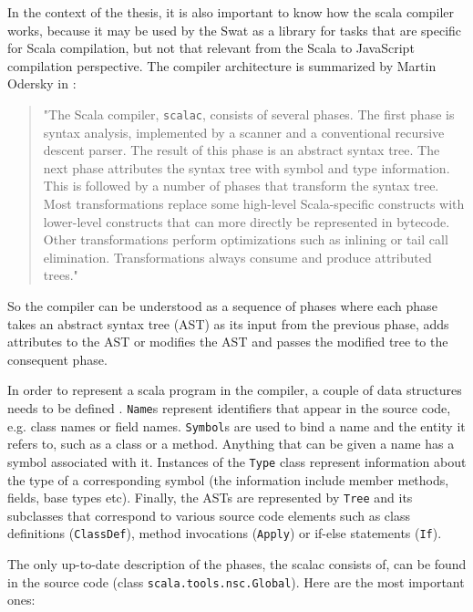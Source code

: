 \documentclass[12pt,a4paper]{report}
\begin{document}
In the context of the thesis, it is also important to know how the scala compiler works, because it may be used by the Swat as a library for tasks that are specific for Scala compilation, but not that relevant from the Scala to JavaScript compilation perspective. The compiler architecture is summarized by Martin Odersky in \cite{ScalableComponents}:

\begin{quote}
"The Scala compiler, \texttt{scalac}, consists of several phases. The first phase is syntax analysis, implemented by a scanner and a conventional recursive descent parser. The result of this phase is an abstract syntax tree. The next phase attributes the syntax tree with symbol and type information. This is followed by a number of phases that transform the syntax tree. Most transformations replace some high-level Scala-specific constructs with lower-level constructs that can more directly be represented in bytecode. Other transformations perform optimizations such as inlining or tail call elimination. Transformations always consume and produce attributed trees."
\end{quote}

So the compiler can be understood as a sequence of phases where each phase takes an abstract syntax tree (AST) as its input from the previous phase, adds attributes to the AST or modifies the AST and passes the modified tree to the consequent phase.

In order to represent a scala program in the compiler, a couple of data structures needs to be defined\cite{Reflection}
. \texttt{Name}s represent identifiers that appear in the source code, e.g. class names or field names. \texttt{Symbol}s are used to bind a name and the entity it refers to, such as a class or a method. Anything that can be given a name has a symbol associated with it. Instances of the \texttt{Type} class represent information about the type of a corresponding symbol (the information include member methods, fields, base types etc). Finally, the ASTs are represented by \texttt{Tree} and its subclasses that correspond to various source code elements such as class definitions (\texttt{ClassDef}), method invocations (\texttt{Apply}) or if-else statements (\texttt{If}).

The only up-to-date description of the phases, the scalac consists of, can be found in the source code (class \texttt{scala.tools.nsc.Global}). Here are the most important ones:
\end{document}
